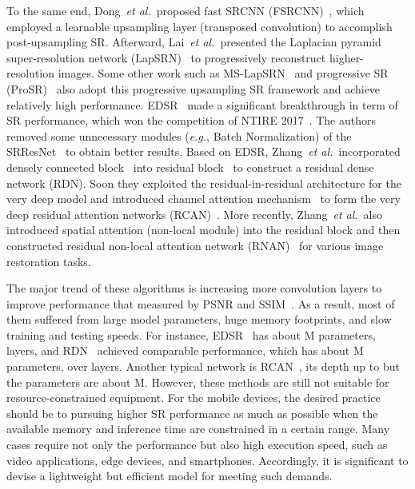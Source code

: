 \documentclass[sigconf]{acmart}
\newcommand{\etal}{\emph{et al.}~}
\newcommand{\eg}{\emph{e.g.}}
\begin{document}
To the same end, Dong~\etal proposed fast SRCNN (FSRCNN)~\cite{FSRCNN}, which employed a learnable upsampling layer (transposed convolution) to accomplish post-upsampling SR. Afterward, Lai~\etal presented the Laplacian pyramid super-resolution network (LapSRN)~\cite{LapSRN} to progressively reconstruct higher-resolution images. Some other work such as MS-LapSRN~\cite{MS-LapSRN} and progressive SR (ProSR)~\cite{ProSR} also adopt this progressive upsampling SR framework and achieve relatively high performance. EDSR~\cite{EDSR} made a significant breakthrough in term of SR performance, which won the competition of NTIRE 2017~\cite{NTIRE2017_dataset,NTIRE2017_methods}. The authors removed some unnecessary modules (\eg, Batch Normalization) of the SRResNet~\cite{SRGAN} to obtain better results. Based on EDSR, Zhang~\etal incorporated densely connected block~\cite{DenseNet,SRDenseNet} into residual block~\cite{ResNet} to construct a residual dense network (RDN). Soon they exploited the residual-in-residual architecture for the very deep model and introduced channel attention mechanism~\cite{SENet} to form the very deep residual attention networks (RCAN)~\cite{RCAN}. More recently, Zhang~\etal also introduced spatial attention (non-local module) into the residual block and then constructed residual non-local attention network (RNAN)~\cite{RNAN} for various image restoration tasks.

The major trend of these algorithms is increasing more convolution layers to improve performance that measured by PSNR and SSIM~\cite{SSIM}. As a result, most of them suffered from large model parameters, huge memory footprints, and slow training and testing speeds. For instance, EDSR~\cite{EDSR} has about M parameters,  layers, and RDN~\cite{RDN} achieved comparable performance, which has about M parameters, over  layers. Another typical network is RCAN~\cite{RCAN}, its depth up to  but the parameters are about M. However, these methods are still not suitable for resource-constrained equipment. For the mobile devices, the desired practice should be to pursuing higher SR performance as much as possible when the available memory and inference time are constrained in a certain range. 
Many cases require not only the performance but also high execution speed, such as video applications, edge devices, and smartphones. Accordingly, it is significant to devise a lightweight but efficient model for meeting such demands. 
\end{document}

